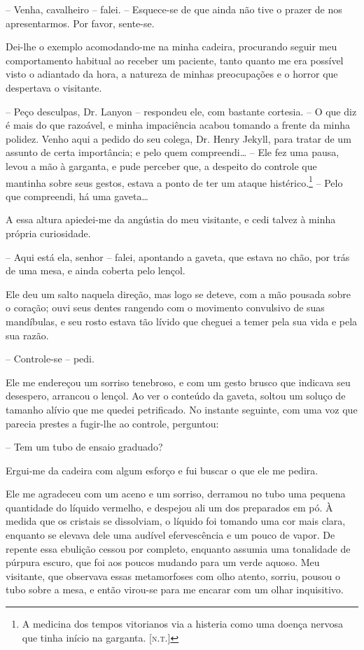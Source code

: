 -- Venha, cavalheiro -- falei. -- Esquece-se de que ainda não tive o
prazer de nos apresentarmos.  Por favor, sente-se.

Dei-lhe o exemplo acomodando-me na minha cadeira, procurando seguir meu
comportamento habitual ao receber um paciente, tanto quanto me era
possível visto o adiantado da hora, a natureza de minhas preocupações e
o horror que despertava o visitante.

-- Peço desculpas, Dr. Lanyon -- respondeu ele, com bastante cortesia. --
O que diz é mais do que razoável, e minha impaciência acabou tomando a
frente da minha polidez.  Venho aqui a pedido do seu colega, Dr. Henry
Jekyll, para tratar de um assunto de certa importância; e pelo quem
compreendi\ldots{} -- Ele fez uma pausa, levou a mão à garganta, e pude
perceber que, a despeito do controle que mantinha sobre seus gestos,
estava a ponto de ter um ataque histérico.\footnote{ A medicina
dos tempos vitorianos via a histeria como uma doença nervosa
que tinha início na garganta. [\textsc{n.t.}]} --
Pelo que compreendi, há uma gaveta\ldots{}

A essa altura apiedei-me da angústia do meu visitante, e cedi talvez à
minha própria curiosidade.

-- Aqui está ela, senhor -- falei, apontando a gaveta, que estava no
chão, por trás de uma mesa, e ainda coberta pelo lençol.

Ele deu um salto naquela direção, mas logo se deteve, com a mão pousada
sobre o coração; ouvi seus dentes rangendo com o movimento convulsivo
de suas mandíbulas, e seu rosto estava tão lívido que cheguei a temer
pela sua vida e pela sua razão.

-- Controle-se -- pedi.

Ele me endereçou um sorriso tenebroso, e com um gesto brusco que
indicava seu desespero, arrancou o lençol.  Ao ver o conteúdo da
gaveta, soltou um soluço de tamanho alívio que me quedei petrificado. 
No instante seguinte, com uma voz que parecia prestes a fugir-lhe ao
controle, perguntou:

-- Tem um tubo de ensaio graduado?

Ergui-me da cadeira com algum esforço e fui buscar o que ele me pedira.

Ele me agradeceu com um aceno e um sorriso, derramou no tubo uma pequena
quantidade do líquido vermelho, e despejou ali um dos preparados em pó.
 À medida que os cristais se dissolviam, o líquido foi tomando uma cor
mais clara, enquanto se elevava dele uma audível efervescência e um
pouco de vapor.  De repente essa ebulição cessou por completo, enquanto
assumia uma tonalidade de púrpura escuro, que foi aos poucos mudando
para um verde aquoso.  Meu visitante, que observava essas metamorfoses
com olho atento, sorriu, pousou o tubo sobre a mesa, e então virou-se
para me encarar com um olhar inquisitivo.

